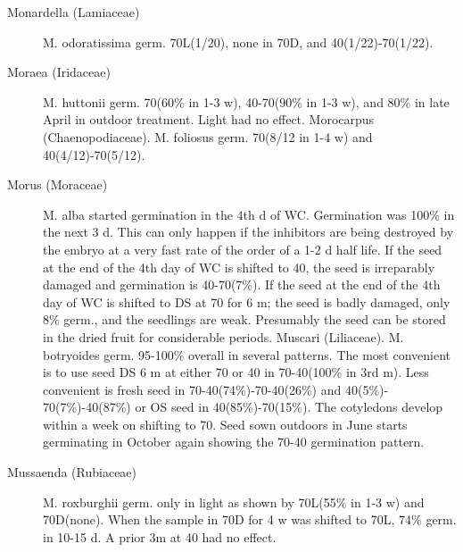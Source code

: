 \begin{description}
\item[Monardella (Lamiaceae)] M. odoratissima germ. 70L(1/20), none in 70D,
and 40(1/22)-70(1/22).
\item[Moraea (Iridaceae)] M. huttonii germ. 70(60\% in 1-3 w), 40-70(90\% in 1-3
w), and 80\% in late April in outdoor treatment. Light had no effect.
Morocarpus (Chaenopodiaceae). M. foliosus germ. 70(8/12 in 1-4 w) and
40(4/12)-70(5/12).

\item[Morus (Moraceae)] M. alba started germination in the 4th d of WC.
Germination was 100\% in the next 3 d. This can only happen if the inhibitors are
being destroyed by the embryo at a very fast rate of the order of a 1-2 d half life. If the
seed at the end of the 4th day of WC is shifted to 40, the seed is irreparably damaged
and germination is 40-70(7\%). If the seed at the end of the 4th day of WC is shifted to
DS at 70 for 6 m; the seed is badly damaged, only 8\% germ., and the seedlings are
weak. Presumably the seed can be stored in the dried fruit for considerable periods.
Muscari (Liliaceae). M. botryoides germ. 95-100\% overall in several
patterns. The most convenient is to use seed DS 6 m at either 70 or 40 in 70-40(100\%
in 3rd m). Less convenient is fresh seed in 70-40(74\%)-70-40(26\%) and 40(5\%)-
70(7\%)-40(87\%) or OS seed in 40(85\%)-70(15\%). The cotyledons develop within a
week on shifting to 70. Seed sown outdoors in June starts germinating in October
again showing the 70-40 germination pattern.

\item[Mussaenda (Rubiaceae)] M. roxburghii germ. only in light as shown by
70L(55\% in 1-3 w) and 70D(none). When the sample in 70D for 4 w was shifted to
70L, 74\% germ. in 10-15 d. A prior 3m at 40 had no effect.


\end{description}
